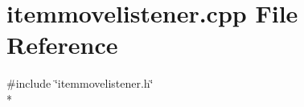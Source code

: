\section{itemmovelistener.\+cpp File Reference}
\label{bk3_2items_2itemmovelistener_8cpp}
{\ttfamily \#include \char`\"{}itemmovelistener.\+h\char`\"{}}\\*
